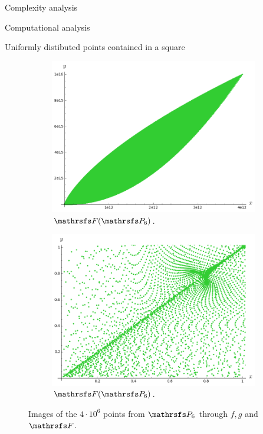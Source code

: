 \documentclass[11pt, a4paper, english, twoside, notitlepage, openright]{report}
\begin{document}
\begin{chapter}{Complexity analysis}
\begin{section}{Computational analysis}
\begin{subsection}{Uniformly distibuted points contained in a square}
\begin{figure}
\hspace{-0.1cm}
\begin{subfigure}{.49\linewidth}\centering
\includegraphics[width=1\textwidth]{plots/ch5_21_P6.png}
\vspace{0cm}\caption{$\FFF(\PP_6)$.\label{fig:FFFP6_1}}
\end{subfigure}
\begin{subfigure}{.49\linewidth}\centering
\includegraphics[width=1\textwidth]{plots/ch5_22_P6prime.png}
\vspace{0cm}\caption{$\FFF(\PP_6)$.\label{fig:FFFP6_2}}
\end{subfigure}
\vspace{0.1cm}\caption{Images of the $4\cdot 10^6$ points from $\PP_6$ through $f, g$ and $\FFF$.\label{fig:P6}}
\end{figure}


\end{subsection}
\end{section}
\end{chapter}
\end{document}
